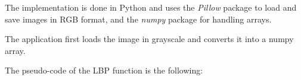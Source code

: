 \documentclass[10pt,twocolumn,letterpaper]{article}
\begin{document}
The implementation is done in Python and uses the \textit{Pillow} package to load and save images in RGB format, and the \textit{numpy} package for handling arrays. 

The application first loads the image in grayscale and converts it into a numpy array.

The pseudo-code of the LBP function is the following:

%		
%		
%
%
%
%
%
%
%
\end{document}
